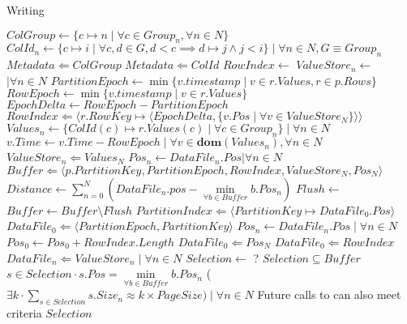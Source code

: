 \documentclass[fleqn]{article}
\let\algIf\If
\let\If\algIf
\begin{document}
\begin{algorithm}
\scriptsize
\caption{Writing}
\begin{algorithmic}[1]
\State $ColGroup \gets \{c \mapsto n \mid \forall c \in Group_{n}, \forall n \in N \}$
\State $ColId_{n} \gets \{c \mapsto i \mid \forall c, d \in G, d < c \implies d \mapsto j \wedge j < i \} \mid \forall n \in N, G \equiv Group_{n}$
\State $Metadata \Leftarrow ColGroup$
\State $Metadata \Leftarrow ColId$
 \State $RowIndex \gets $ 
 \State $ValueStore_{n} \gets $  $ \mid \forall n \in N$
 \State $PartitionEpoch \gets \min \{v.timestamp \mid v \in r.Values, r \in p.Rows\}$
   \State $RowEpoch \gets \min \{v.timestamp \mid v \in r.Values\}$
   \State $EpochDelta \gets RowEpoch - PartitionEpoch$
   \State $RowIndex \Leftarrow \langle r.RowKey \mapsto \langle EpochDelta, \{ v.Pos \mid \forall v \in ValueStore_{N} \}\rangle \rangle $ 
   \State $Values_{n} \gets \{ ColId(c) \mapsto r.Values(c) \mid \forall c \in Group_{n} \} \mid \forall n \in N$
   \State $v.Time \gets v.Time - RowEpoch \mid \forall v \in \mathbf{dom}(Values_{n}), \forall n \in N$
   \State $ ValueStore_{n} \Leftarrow Values_{N} $
 \EndFor
 \State $Pos_{n} \gets DataFile_{n}.Pos | \forall n \in N$
 \State $Buffer \Leftarrow \langle p.PartitionKey, PartitionEpoch, RowIndex, ValueStore_{N}, Pos_{N} \rangle$
 \State $Distance \gets \sum\limits_{n=0}^{N} (DataFile_{n}.pos - \min\limits_{\forall b \in Buffer} b.Pos_{n}) $
   \State $Flush \gets$ 
   \State {}
   \State $Buffer \gets Buffer \setminus Flush$
 \EndIf
\EndFor
\State {}
\EndProcedure
{}
    \State $PartitionIndex \Leftarrow \langle PartitionKey \mapsto DataFile_{0}.Pos \rangle $
    \State $DataFile_{0} \Leftarrow \langle PartitionEpoch, PartitionKey \rangle$
    \State $Pos_{n} \gets DataFile_{n}.Pos \mid \forall n \in N$
    \State $Pos_{0} \gets Pos_0 + RowIndex.Length$
    \State $DataFile_{0} \Leftarrow Pos_{N}$
    \State $DataFile_{0} \Leftarrow RowIndex$
    \State $DataFile_{n} \Leftarrow ValueStore_{n} \mid \forall n \in N$
   \EndFor
\EndProcedure
{}
\State $Selection \gets$ ?
\Ensure $Selection \subseteq Buffer$
\Ensure $s \in Selection \cdot s.Pos = \min\limits_{\forall b \in Buffer} b.Pos_{n}$
\Ensure ($\exists k \cdot \sum\limits_{s \in Selection} s.Size_{n} \approx k \times PageSize) \mid \forall n \in N $
\Ensure Future calls to  can also meet criteria
\State \Return $Selection$
\EndFunction
\end{algorithmic}
\end{algorithm}
\end{document}
